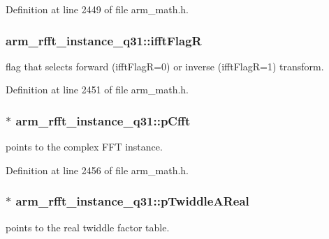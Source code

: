 Definition at line 2449 of file arm\-\_\-math.\-h.

\hypertarget{structarm__rfft__instance__q31_af5c2615e6cde15524df38fa57ea32d94}{
\subsubsection[{ifft\-Flag\-R}]{ arm\-\_\-rfft\-\_\-instance\-\_\-q31\-::ifft\-Flag\-R}}\label{structarm__rfft__instance__q31_af5c2615e6cde15524df38fa57ea32d94}
flag that selects forward (ifft\-Flag\-R=0) or inverse (ifft\-Flag\-R=1) transform. 

Definition at line 2451 of file arm\-\_\-math.\-h.

\hypertarget{structarm__rfft__instance__q31_ac6bf12707e1985818d161616adf27977}{
\subsubsection[{p\-Cfft}]{$\ast$ arm\-\_\-rfft\-\_\-instance\-\_\-q31\-::p\-Cfft}}\label{structarm__rfft__instance__q31_ac6bf12707e1985818d161616adf27977}
points to the complex F\-F\-T instance. 

Definition at line 2456 of file arm\-\_\-math.\-h.

\hypertarget{structarm__rfft__instance__q31_a2a0c944e66bab92fcbe19d1c29153250}{
\subsubsection[{p\-Twiddle\-A\-Real}]{$\ast$ arm\-\_\-rfft\-\_\-instance\-\_\-q31\-::p\-Twiddle\-A\-Real}}\label{structarm__rfft__instance__q31_a2a0c944e66bab92fcbe19d1c29153250}
points to the real twiddle factor table. 

